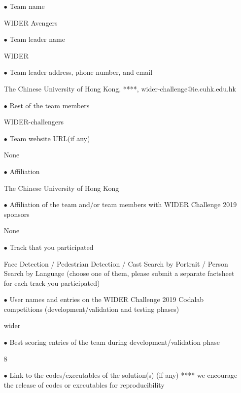 \documentclass[runningheads]{llncs}
\begin{document}
\begin{spacing}{1.5}
\begin{itemize}

\item[$\bullet$] Team name

WIDER Avengers

\item[$\bullet$] Team leader name

WIDER

\item[$\bullet$] Team leader address, phone number, and email

The Chinese University of Hong Kong, ****, wider-challenge@ie.cuhk.edu.hk

\item[$\bullet$] Rest of the team members

WIDER-challengers

\item[$\bullet$] Team website URL(if any)

None

\item[$\bullet$] Affiliation

The Chinese University of Hong Kong

\item[$\bullet$] Affiliation of the team and/or team members with WIDER Challenge 2019 sponsors

None

\item[$\bullet$]Track that you participated

Face Detection / Pedestrian Detection / Cast Search by Portrait / Person Search by Language (choose one of them, please submit a separate factsheet for each track you participated)

\item[$\bullet$]User names and entries on the WIDER Challenge 2019 Codalab competitions (development/validation and testing phases)

wider

\item[$\bullet$]Best scoring entries of the team during development/validation phase

8

\item[$\bullet$]Link to the codes/executables of the solution(s) (if any)
**** we encourage the release of codes or executables for reproducibility

\end{itemize}
\end{spacing}
\end{document}
